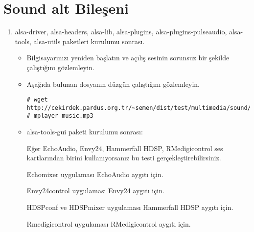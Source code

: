\documentclass[a4paper,10pt]{article}
\begin{document}
\section{Sound alt Bileşeni}
\begin{enumerate}
 \item alsa-driver, alsa-headers, alsa-lib, alsa-plugins, alsa-plugins-pulseaudio, alsa-tools, alsa-utils paketleri kurulumu sonrası.
\begin{itemize}
 \item Bilgisayarınızı yeniden başlatın ve açılış sesinin sorunsuz bir şekilde çalıştığını gözlemleyin.
 \item Aşağıda bulunan dosyanın düzgün çalıştığını gözlemleyin.
\begin{verbatim}
# wget http://cekirdek.pardus.org.tr/~semen/dist/test/multimedia/sound/sound/sample.mp3
# mplayer music.mp3
\end{verbatim}

\item alsa-tools-gui paketi kurulumu sonrası:

Eğer  EchoAudio, Envy24, Hammerfall HDSP, RMedigicontrol ses kartlarından birini kullanıyorsanız bu testi gerçekleştirebilirsiniz.

Echomixer uygulaması EchoAudio aygıtı için.

Envy24control uygulaması Envy24 aygıtı için.

HDSPconf ve HDSPmixer uygulaması Hammerfall HDSP aygıtı için.

Rmedigicontrol uygulaması RMedigicontrol aygıtı için.
\end{itemize}


\end{enumerate}
\end{document}
